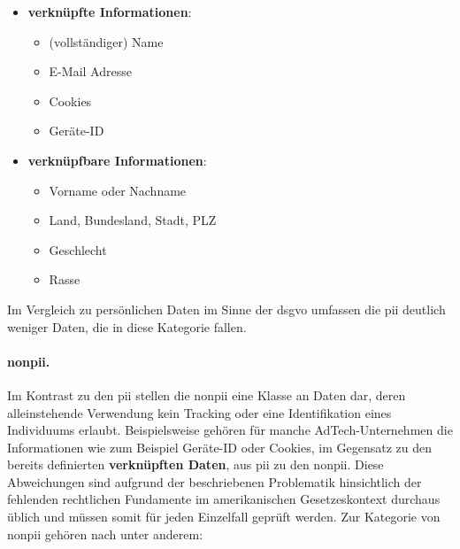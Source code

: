 \begin{itemize}
	\item \textbf{verknüpfte Informationen}:
		\begin{itemize}
			\item (vollständiger) Name
			\item E-Mail Adresse
			\item Cookies
			\item Geräte-ID
		\end{itemize}
	\item \textbf{verknüpfbare Informationen}:
		\begin{itemize}
			\item Vorname oder Nachname
			\item Land, Bundesland, Stadt, PLZ
			\item Geschlecht
			\item Rasse
		\end{itemize}
\end{itemize}

\noindent Im Vergleich zu persönlichen Daten im Sinne der \ac{dsgvo} umfassen die \acs{pii} deutlich weniger Daten, die in diese Kategorie fallen.


\paragraph{\acf{nonpii}.}
\label{sec:Grundlagen:para:Non Personal Identifiable Information}
Im Kontrast zu den \ac{pii} stellen die \ac{nonpii} eine Klasse an Daten dar, deren alleinstehende Verwendung kein Tracking oder eine Identifikation eines Individuums erlaubt. Beispielsweise gehören für manche AdTech-Unternehmen die Informationen wie zum Beispiel Geräte-ID oder Cookies, im Gegensatz zu den bereits definierten \textbf{verknüpften Daten}, aus \ac{pii} zu den \ac{nonpii}. Diese Abweichungen sind aufgrund der beschriebenen Problematik hinsichtlich der fehlenden rechtlichen Fundamente im amerikanischen Gesetzeskontext durchaus üblich und müssen somit für jeden Einzelfall geprüft werden. Zur Kategorie von \ac{nonpii} gehören nach \cite{PiwikPro2022} unter anderem:

